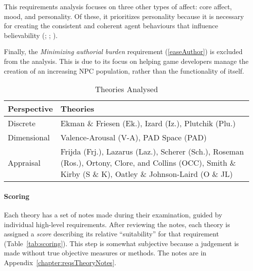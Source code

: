 This requirements analysis focuses on three other types of affect: core affect,
mood, and personality. Of these, it prioritizes personality because it is
necessary for creating the consistent and coherent agent behaviours that
influence believability (;
; ).

Finally, the \textit{Minimizing authorial burden} requirement
(\ref{easeAuthor}) is excluded from the analysis. This is due to its focus on
helping game developers manage the creation of an increasing NPC population,
rather than the functionality of \progname{} itself.

\begin{table}[!tbh]
    \renewcommand{\arraystretch}{1.2}
    \centering
    \caption{Theories Analysed}
    \label{tab:theories}
    \begin{tabular}{P{0.2\columnwidth}P{0.65\columnwidth}}
        \toprule
        \textbf{Perspective} & \textbf{Theories} \\
        \midrule

        Discrete & Ekman \& Friesen (Ek.), Izard (Iz.),
        Plutchik (Plu.) \\

        Dimensional & Valence-Arousal (V-A), PAD Space (PAD) \\

        Appraisal & Frijda (Frj.), Lazarus (Laz.), Scherer
        (Sch.), Roseman (Ros.), Ortony, Clore, and Collins (OCC), Smith \&
        Kirby (S \& K), Oatley \& Johnson-Laird (O \& JL) \\

        \bottomrule
    \end{tabular}
\end{table}

\paragraph{Scoring} Each theory has a set of notes made during their
examination, guided by individual high-level requirements. After reviewing the
notes, each theory is assigned a \textit{score} describing its relative
``suitability'' for that requirement (Table~\ref{tab:scoring}). This step is
somewhat subjective because a judgement is made without true objective measures
or methods. The notes are in Appendix~\ref{chapter:reqsTheoryNotes}.

